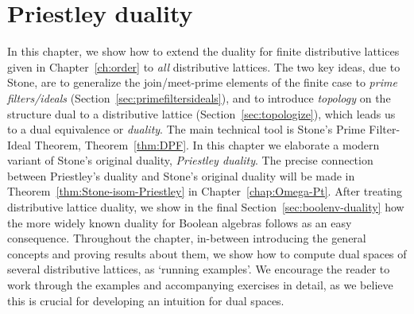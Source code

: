 \chapter{Priestley duality}\label{ch:priestley}

In this chapter, we show how to extend the duality for finite distributive lattices given in Chapter~\ref{ch:order} to \emph{all} distributive lattices. The two key ideas, due to Stone, are to generalize the join/meet-prime elements of the finite case to \emph{prime filters/ideals} (Section~\ref{sec:primefiltersideals}), and to introduce \emph{topology} on the structure dual to a distributive lattice (Section~\ref{sec:topologize}), which leads us to a dual equivalence or \emph{duality}. The main technical tool is Stone's Prime Filter-Ideal Theorem, Theorem~\ref{thm:DPF}. In this chapter we elaborate a modern variant of Stone's original duality, \emph{Priestley duality}. The precise connection between Priestley's duality and Stone's original duality will be made in Theorem~\ref{thm:Stone-isom-Priestley} in Chapter~\ref{chap:Omega-Pt}. After treating distributive lattice duality, we show in the final Section~\ref{sec:boolenv-duality} how the more widely known duality for Boolean algebras follows as an easy consequence. Throughout the chapter, in-between introducing the general concepts and proving results about them, we show how to compute dual spaces of several distributive lattices, as `running examples'. We encourage the reader to work through the examples and accompanying exercises in detail, as we believe this is crucial for developing an intuition for dual spaces.

